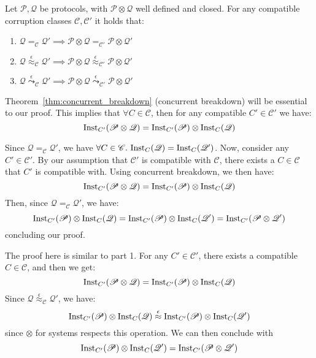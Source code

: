 \begin{theorem}
  Let $\mathscr{P}, \mathscr{Q}$ be protocols, with $\mathscr{P} \otimes \mathscr{Q}$
  well defined and closed. For any compatible corruption classes $\mathscr{C}, \mathscr{C}'$
  it holds that:
  \begin{enumerate}
    \item $\mathscr{Q} =_{\mathscr{C}} \mathscr{Q}' \implies \mathscr{P} \otimes \mathscr{Q} =_{\mathscr{C}'} \mathscr{P} \otimes \mathscr{Q}'$
    \item $\mathscr{Q} \overset{\epsilon}{\approx}_{\mathscr{C}} \mathscr{Q}' \implies \mathscr{P} \otimes \mathscr{Q} \overset{\epsilon}{\approx}_{\mathscr{C}'} \mathscr{P} \otimes \mathscr{Q}'$
    \item $\mathscr{Q} \overset{\epsilon}{\leadsto}_{\mathscr{C}} \mathscr{Q}' \implies \mathscr{P} \otimes \mathscr{Q} \overset{\epsilon}{\leadsto}_{\mathscr{C}'} \mathscr{P} \otimes \mathscr{Q}'$
  \end{enumerate}

   Theorem~\ref{thm:concurrent_breakdown} (concurrent breakdown)
  will be essential to our proof.
  This implies that $\forall C \in \mathscr{C}$, then for any compatible $C' \in \mathscr{C}'$
  we have:
  $$
  \text{Inst}_{C'}(\mathscr{P} \otimes \mathscr{Q}) = \text{Inst}_{C'}(\mathscr{P}) \otimes \text{Inst}_{C}(\mathscr{Q})
  $$

Since $\mathscr{Q} =_{\mathscr{C}} \mathscr{Q}'$, we have $\forall C \in \mathscr{C}.\ \tx{Inst}_C(\mathscr{Q}) = \tx{Inst}_C(\mathscr{Q}')$.
Now, consider any $C' \in \mathscr{C}'$.
By our assumption that $\mathscr{C}'$ is compatible with $\mathscr{C}$,
there exists a $C \in \mathscr{C}$ that $C'$ is compatible with.
Using concurrent breakdown, we then have:
$$
\text{Inst}_{C'}(\mathscr{P} \otimes \mathscr{Q}) =
\text{Inst}_{C'}(\mathscr{P}) \otimes \text{Inst}_C(\mathscr{Q})
$$
Then, since $\mathscr{Q} =_{\mathscr{C}} \mathscr{Q}'$, we have:
$$
\text{Inst}_{C'}(\mathscr{P}) \otimes \text{Inst}_C(\mathscr{Q}) =
\text{Inst}_{C'}(\mathscr{P}) \otimes \text{Inst}_C(\mathscr{Q}') =
\text{Inst}_{C'}(\mathscr{P} \otimes \mathscr{Q}')
$$
concluding our proof.

The proof here is similar to part 1.
For any $C' \in \mathscr{C}'$, there exists a compatible $C \in \mathscr{C}$,
and then we get:
$$
\text{Inst}_{C'}(\mathscr{P} \otimes \mathscr{Q}) =
\text{Inst}_{C'}(\mathscr{P}) \otimes \text{Inst}_C(\mathscr{Q})
$$
Since $\mathscr{Q} \overset{\epsilon}{\approx}_{\mathscr{C}} \mathscr{Q}'$,
we have:
$$
\text{Inst}_{C'}(\mathscr{P}) \otimes \text{Inst}_C(\mathscr{Q})
\overset{\epsilon}{\approx} 
\text{Inst}_{C'}(\mathscr{P}) \otimes \text{Inst}_C(\mathscr{Q}')
$$
since $\otimes$ for systems respects this operation.
We can then conclude with
$$
\text{Inst}_{C'}(\mathscr{P}) \otimes \text{Inst}_C(\mathscr{Q}') =
\text{Inst}_{C'}(\mathscr{P} \otimes \mathscr{Q}')
$$


\end{theorem}
